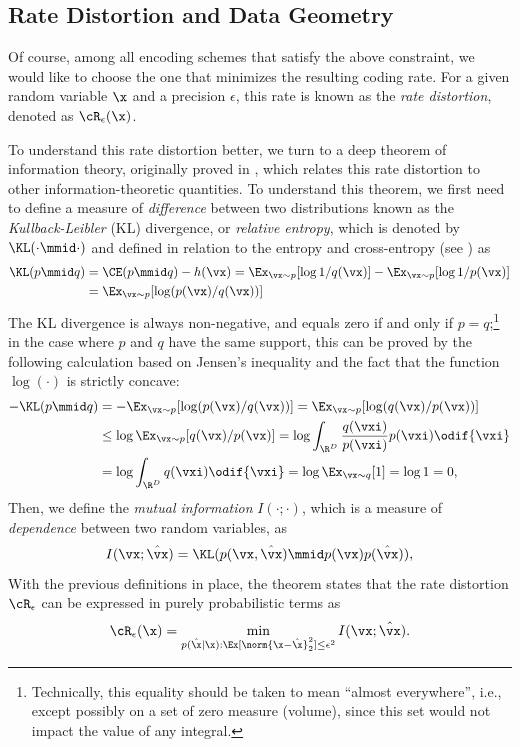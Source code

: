 \documentclass[../../book-main.tex]{subfiles}
\begin{document}
\subsection{Rate Distortion and Data Geometry}
Of course, among all encoding schemes that satisfy the above constraint, we
would like to choose the one that minimizes the resulting coding rate. For
a given random variable $\x$ and a precision $\epsilon$, this rate is known as
the \textit{rate distortion}, denoted as $\cR_{\epsilon}(\x)$.

To understand this rate distortion better, we turn to a deep theorem of information theory, originally proved in \textcite{shannon1959coding}, which relates this rate distortion to other information-theoretic quantities. To understand this theorem, we first need to define a measure of \textit{difference} between two distributions known as the \textit{Kullback-Leibler} (KL) divergence, or \textit{relative entropy}, which is denoted by \(\KL(\cdot \mmid \cdot)\) and defined in relation to the entropy and cross-entropy (see ) as
\begin{align}
	\KL(p \mmid q) &= \CE(p \mmid q) - h(\vx) = \Ex_{\vx \sim p}[\log 1/q(\vx)] - \Ex_{\vx \sim p}[\log 1/p(\vx)] \\
	&= \Ex_{\vx \sim p}[\log (p(\vx)/q(\vx))]
\end{align}
The KL divergence is always non-negative, and equals zero if and only if \(p = q\);\footnote{Technically, this equality should be taken to mean ``almost everywhere'', i.e., except possibly on a set of zero measure (volume), since this set would not impact the value of any integral.} in the case where \(p\) and \(q\) have the same support, this can be proved by the following calculation based on Jensen's inequality and the fact that the function \(\log(\cdot)\) is strictly concave:
\begin{align}
	- \KL(p\mmid q)
	&= -\Ex_{\vx \sim p}[\log(p(\vx)/q(\vx))] = \Ex_{\vx \sim p}[\log(q(\vx)/p(\vx))] \\
	&\leq \log \Ex_{\vx \sim p}[q(\vx)/p(\vx)] =  \log \int_{\R^{D}} \frac{q(\vxi)}{p(\vxi)}p(\vxi)\odif{\vxi} \\
	&= \log \int_{\R^{D}}q(\vxi)\odif{\vxi} = \log \Ex_{\vx \sim q}[1] = \log 1 = 0,
\end{align}
Then, we define the \textit{mutual information} \(I(\cdot; \cdot)\), which is a measure of \textit{dependence} between two random variables, as
\begin{equation}\label{eq:mutual-information}
	I(\vx; \hat{\vx})
	= \KL(p(\vx, \hat{\vx}) \mmid p(\vx) p(\hat{\vx})),
\end{equation}
With the previous definitions in place, the theorem states that the rate distortion \(\cR_{\epsilon}\) can be expressed in purely probabilistic terms as
\begin{equation}
	\cR_{\epsilon}(\x) 
	= \min_{p(\hat \x \mid \x): \Ex[\norm{\x -\hat \x}_2^{2}] \le \epsilon^{2}} 
	I(\vx; \hat{\vx}).
    \label{eqn:rate-distortion-general}
\end{equation}
\end{document}
